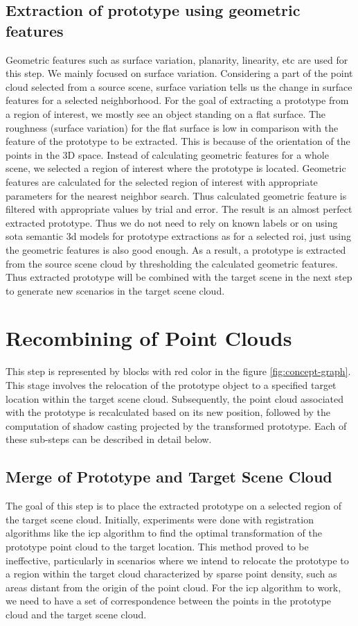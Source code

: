 \subsection{Extraction of prototype using geometric features}
Geometric features such as surface variation, planarity, linearity, etc are used for this step. We mainly focused on surface variation. Considering a part of the point cloud selected from a source scene, surface variation tells us the change in surface features for a selected neighborhood. For the goal of extracting a prototype from a region of interest, we mostly see an object standing on a flat surface. The roughness (surface variation) for the flat surface is low in comparison with the feature of the prototype to be extracted. This is because of the orientation of the points in the 3D space. Instead of calculating geometric features for a whole scene, we selected a region of interest where the prototype is located. Geometric features are calculated for the selected region of interest with appropriate parameters for the nearest neighbor search. Thus calculated geometric feature is filtered with appropriate values by trial and error. The result is an almost perfect extracted prototype. Thus we do not need to rely on known labels or on using \acrshort{sota} semantic 3d models for prototype extractions as for a selected \acrfull{roi}, just using the geometric features is also good enough. As a result, a prototype is extracted from the source scene cloud by thresholding the calculated geometric features. Thus extracted prototype will be combined with the target scene in the next step to generate new scenarios in the target scene cloud.

\section{Recombining of Point Clouds}
This step is represented by blocks with red color in the figure \ref{fig:concept-graph}. This stage involves the relocation of the prototype object to a specified target location within the target scene cloud. Subsequently, the point cloud associated with the prototype is recalculated based on its new position, followed by the computation of shadow casting projected by the transformed prototype. Each of these sub-steps can be described in detail below.

\subsection{Merge of Prototype and Target Scene Cloud}
The goal of this step is to place the extracted prototype on a selected region of the target scene cloud. Initially, experiments were done with registration algorithms like the \acrfull{icp} algorithm to find the optimal transformation of the prototype point cloud to the target location. This method proved to be ineffective, particularly in scenarios where we intend to relocate the prototype to a region within the target cloud characterized by sparse point density, such as areas distant from the origin of the point cloud. For the \acrshort{icp} algorithm to work, we need to have a set of correspondence between the points in the prototype cloud and the target scene cloud. 

